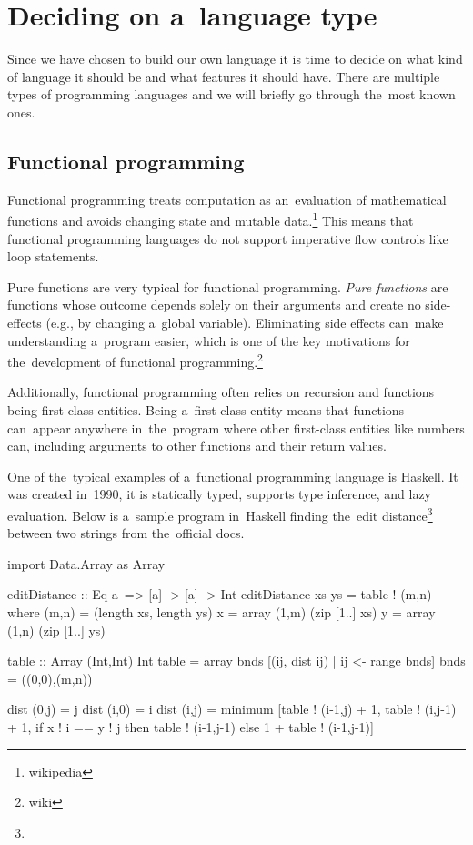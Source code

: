 \section{Deciding on a~language type}
Since we have chosen to build our own language it is time to decide on what kind of language it should be and what features it should have. There are
multiple types of programming languages and we will briefly go through the~most known ones.

\subsection{Functional programming}
Functional programming treats computation as an~evaluation of mathematical functions and avoids changing state and mutable data.\footnote{wikipedia}
This means that functional programming languages do not support imperative flow controls like loop statements.

Pure functions are very typical for functional programming. \emph{Pure functions} are functions whose outcome depends solely on their arguments
and create no side-effects (e.g., by changing a~global variable). Eliminating side effects can~make understanding a~program easier, which is one of the
key motivations for the~development of functional programming.\footnote{wiki}

Additionally, functional programming often relies on recursion and functions being first-class entities. Being a~first-class entity means that functions can~appear
anywhere in~the~program where other first-class entities like numbers can, including arguments to other functions and their return values.

One of the~typical examples of a~functional programming language is Haskell. It was created in~1990, it is statically typed, supports type inference,
and lazy evaluation. Below is a~sample program in~Haskell finding the~edit distance\footnote{} between two strings from the~official docs.
\begin{code}
import Data.Array as Array

editDistance :: Eq a~=> [a] -> [a] -> Int
editDistance xs ys = table ! (m,n)
    where
    (m,n) = (length xs, length ys)
    x     = array (1,m) (zip [1..] xs)
    y     = array (1,n) (zip [1..] ys)
    
    table :: Array (Int,Int) Int
    table = array bnds [(ij, dist ij) | ij <- range bnds]
    bnds  = ((0,0),(m,n))
    
    dist (0,j) = j
    dist (i,0) = i
    dist (i,j) = minimum [table ! (i-1,j) + 1, table ! (i,j-1) + 1,
        if x ! i == y ! j
            then table ! (i-1,j-1)
            else 1 + table ! (i-1,j-1)]
\end{code}

